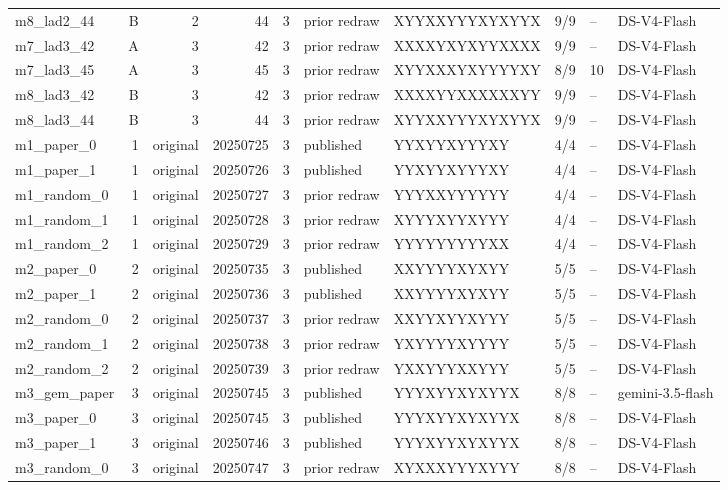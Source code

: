 \begin{longtable}{p{2.6cm}rrrp{.8cm}p{1.6cm}p{3.0cm}p{1.0cm}p{1.0cm}p{2.0cm}}
m8\_lad2\_44 & B & 2 & 44 & 3 & prior redraw & XYYXXYYYXYXYYX & 9/9 & -- & DS-V4-Flash \\
m7\_lad3\_42 & A & 3 & 42 & 3 & prior redraw & XXXXYXYXYYXXXX & 9/9 & -- & DS-V4-Flash \\
m7\_lad3\_45 & A & 3 & 45 & 3 & prior redraw & XYYXXXYXYYYYXY & 8/9 & 10 & DS-V4-Flash \\
m8\_lad3\_42 & B & 3 & 42 & 3 & prior redraw & XXXXYYXXXXXXYY & 9/9 & -- & DS-V4-Flash \\
m8\_lad3\_44 & B & 3 & 44 & 3 & prior redraw & XYYXXYYYXYXYYX & 9/9 & -- & DS-V4-Flash \\
m1\_paper\_0 & 1 & original & 20250725 & 3 & published & YYXYYXYYYXY & 4/4 & -- & DS-V4-Flash \\
m1\_paper\_1 & 1 & original & 20250726 & 3 & published & YYXYYXYYYXY & 4/4 & -- & DS-V4-Flash \\
m1\_random\_0 & 1 & original & 20250727 & 3 & prior redraw & YYYXXYYYYYY & 4/4 & -- & DS-V4-Flash \\
m1\_random\_1 & 1 & original & 20250728 & 3 & prior redraw & XYYYXYYXYYY & 4/4 & -- & DS-V4-Flash \\
m1\_random\_2 & 1 & original & 20250729 & 3 & prior redraw & YYYYYYYYYXX & 4/4 & -- & DS-V4-Flash \\
m2\_paper\_0 & 2 & original & 20250735 & 3 & published & XXYYYYXYXYY & 5/5 & -- & DS-V4-Flash \\
m2\_paper\_1 & 2 & original & 20250736 & 3 & published & XXYYYYXYXYY & 5/5 & -- & DS-V4-Flash \\
m2\_random\_0 & 2 & original & 20250737 & 3 & prior redraw & XXYYXYYXYYY & 5/5 & -- & DS-V4-Flash \\
m2\_random\_1 & 2 & original & 20250738 & 3 & prior redraw & YXYYYYXYYYY & 5/5 & -- & DS-V4-Flash \\
m2\_random\_2 & 2 & original & 20250739 & 3 & prior redraw & YXXYYYXXYYY & 5/5 & -- & DS-V4-Flash \\
m3\_gem\_paper & 3 & original & 20250745 & 3 & published & YYYXYYXYXYYX & 8/8 & -- & gemini-3.5-flash \\
m3\_paper\_0 & 3 & original & 20250745 & 3 & published & YYYXYYXYXYYX & 8/8 & -- & DS-V4-Flash \\
m3\_paper\_1 & 3 & original & 20250746 & 3 & published & YYYXYYXYXYYX & 8/8 & -- & DS-V4-Flash \\
m3\_random\_0 & 3 & original & 20250747 & 3 & prior redraw & XYXXXYYYXYYY & 8/8 & -- & DS-V4-Flash \\

\end{longtable}
